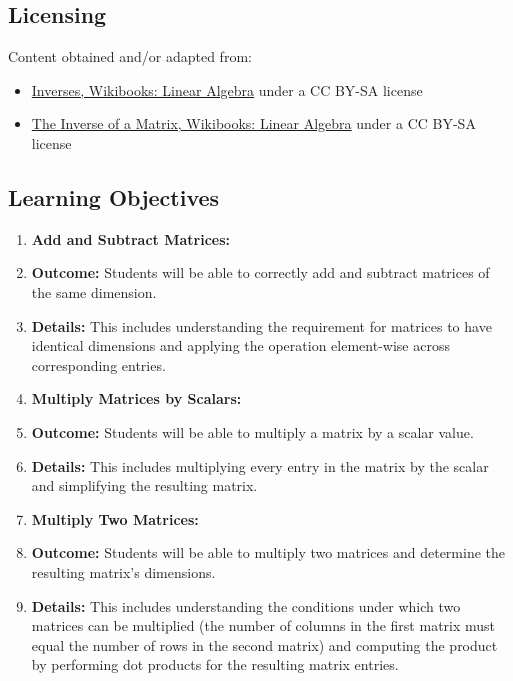 \subsection{Licensing}
\label{sss:lice-7352}




Content obtained and/or adapted from:



\begin{itemize}
    \item \href{https://en.wikibooks.org/wiki/Linear_Algebra/Inverses}{Inverses, Wikibooks: Linear Algebra} under a CC BY-SA license
    \item \href{https://en.wikibooks.org/wiki/Linear_Algebra/The_Inverse_of_a_Matrix}{The Inverse of a Matrix, Wikibooks: Linear Algebra} under a CC BY-SA license
\end{itemize}


\subsection{Learning Objectives}
\label{ssec:lear-fe6e}


\begin{enumerate}
    \item \textbf{Add and Subtract Matrices:}
    \item \textbf{Outcome:} Students will be able to correctly add and subtract matrices of the same dimension.
    \item \textbf{Details:} This includes understanding the requirement for matrices to have identical dimensions and applying the operation element-wise across corresponding entries.
    \item \textbf{Multiply Matrices by Scalars:}
    \item \textbf{Outcome:} Students will be able to multiply a matrix by a scalar value.
    \item \textbf{Details:} This includes multiplying every entry in the matrix by the scalar and simplifying the resulting matrix.
    \item \textbf{Multiply Two Matrices:}
    \item \textbf{Outcome:} Students will be able to multiply two matrices and determine the resulting matrix's dimensions.
    \item \textbf{Details:} This includes understanding the conditions under which two matrices can be multiplied (the number of columns in the first matrix must equal the number of rows in the second matrix) and computing the product by performing dot products for the resulting matrix entries.
\end{enumerate}


